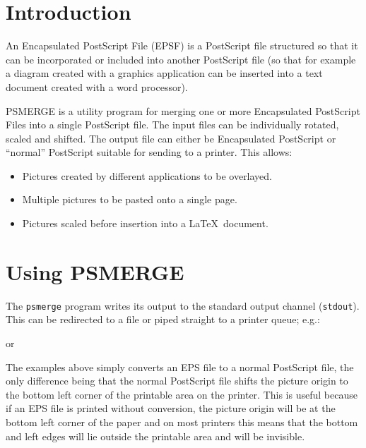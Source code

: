 \documentclass[twoside,11pt,nolof]{starlink}
\begin{document}
\scfrontmatter


\section{Introduction}
\label{introduction}

An Encapsulated PostScript File (EPSF) is a PostScript file structured
so that it can be incorporated or included into another PostScript file
(so that for example a diagram created with a graphics application can
be inserted into a text document created with a word processor).

PSMERGE is a utility program for merging one or more Encapsulated
PostScript Files into a single PostScript file. The input files can be
individually rotated, scaled and shifted. The output file can either be
Encapsulated PostScript or ``normal'' PostScript suitable for sending
to a printer. This allows:

\begin{itemize}
\item Pictures created by different applications to be overlayed.
\item Multiple pictures to be pasted onto a single page.
\item Pictures scaled before insertion into a \LaTeX\ document.
\end{itemize}

\section{Using PSMERGE}
\label{using_psmerge}

The \texttt{psmerge} program writes its output to the standard output channel
(\texttt{stdout}).  This can be redirected to a file or piped straight to a
printer queue; e.g.:

\begin{terminalv}
\end{terminalv}
or
\begin{terminalv}
\end{terminalv}

The examples above simply converts an EPS file to a normal PostScript
file, the only difference being that the normal PostScript file shifts
the picture origin to the bottom left corner of the printable area on
the printer.  This is useful because if an EPS file is printed without
conversion, the picture origin will be at the bottom left corner of the
paper and on most printers this means that the bottom and left edges
will lie outside the printable area and will be invisible.
\end{document}
